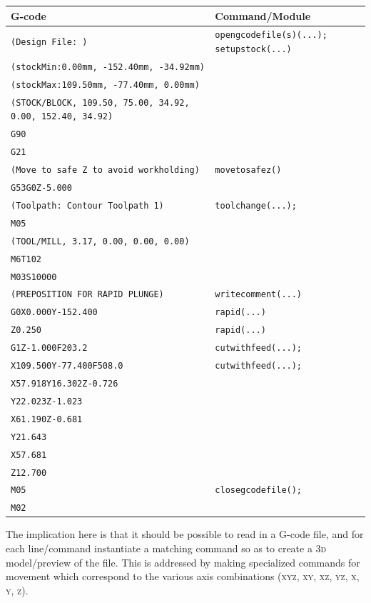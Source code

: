 \documentclass{ltxdoc}
\begin{document}
\noindent \begin{tabular}{@{}ll@{}} \toprule
 G-code                                                           & Command/Module \\ \midrule
 \verb|(Design File: )| &  \texttt{opengcodefile(s)(...);}
                           \texttt{setupstock(...)}\\
 \verb|(stockMin:0.00mm, -152.40mm, -34.92mm)| \\
 \verb|(stockMax:109.50mm, -77.40mm, 0.00mm)| \\
 \verb|(STOCK/BLOCK, 109.50, 75.00, 34.92, 0.00, 152.40, 34.92)| \\
 \verb|G90| \\
 \verb|G21| \\ \midrule
 \verb|(Move to safe Z to avoid workholding)| &  \texttt{movetosafez()} \\
 \verb|G53G0Z-5.000| \\ \midrule
 \verb|(Toolpath: Contour Toolpath 1)| &  \texttt{toolchange(...);}\\
 \verb|M05| \\
 \verb|(TOOL/MILL, 3.17, 0.00, 0.00, 0.00)| \\
 \verb|M6T102| \\
 \verb|M03S10000|  \\ \midrule
 \verb|(PREPOSITION FOR RAPID PLUNGE)| & \texttt{writecomment(...)}\\ \midrule
 \verb|G0X0.000Y-152.400| & \texttt{rapid(...)}\\
 \verb|Z0.250| & \texttt{rapid(...)}\\ \midrule
 \verb|G1Z-1.000F203.2| & \texttt{cutwithfeed(...);}\\  
 \verb|X109.500Y-77.400F508.0| & \texttt{cutwithfeed(...);} \\ 
 \verb|X57.918Y16.302Z-0.726|\\ 
 \verb|Y22.023Z-1.023|\\ 
 \verb|X61.190Z-0.681|\\ 
 \verb|Y21.643|\\ 
 \verb|X57.681|\\
 \verb|Z12.700|\\ \midrule
 \verb|M05| &  \texttt{closegcodefile();}\\
 \verb|M02|\\
 \bottomrule
 \end{tabular}
\bigskip

The implication here is that it should be possible to read in a G-code file, and for each line/\allowbreak command instantiate a matching command so as to create a \textsc{3d} model/preview  of the file. This is addressed by making specialized commands for movement which correspond to the various axis combinations (\textsc{xyz}, \textsc{xy}, \textsc{xz}, \textsc{yz}, \textsc{x}, \textsc{y}, \textsc{z}).
\end{document}
